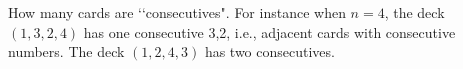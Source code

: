   How many cards are \lq\lq consecutives".
  For instance when $n = 4$, the deck $(1, 3, 2, 4)$ has one consecutive 3,2,
  i.e., adjacent cards with consecutive numbers.
  The deck $(1, 2, 4, 3)$ has two consecutives.
